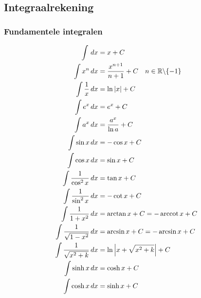 \subsection{Integraalrekening}

\subsubsection{Fundamentele integralen} \label{fundamentele_integralen}

\begin{align*}
  \int \,dx &= x + C\\
  \int x^n \,dx &= \frac{x^{n+1}}{n+1}+C\quad n\in\mathbb{R}\backslash\{-1\}\\
  \int \frac{1}{x} \,dx &= \ln|x| + C\\
  \int e^x \,dx &= e^x + C\\
  \int a^x \,dx &= \frac{a^x}{\ln a} + C\\
  \int \sin x \,dx &= -\cos x + C\\
  \int \cos x \,dx &= \sin x + C\\
  \int \frac{1}{\cos^2 x} \,dx &= \tan x + C\\
  \int \frac{1}{\sin^2 x} \,dx &= -\cot x + C\\
  \int \frac{1}{1+x^2} \,dx &= \arctan x + C = -\operatorname{arccot} x + C\\
  \int \frac{1}{\sqrt{1-x^2}} \,dx &= \arcsin x + C = -\arcsin x + C\\
  \int \frac{1}{\sqrt{x^2+k}} \,dx &= \ln\left|x+\sqrt{x^2+k}\right| + C\\
  \int \sinh x \,dx &= \cosh x + C\\
  \int \cosh x \,dx &= \sinh x + C\\
\end{align*}











